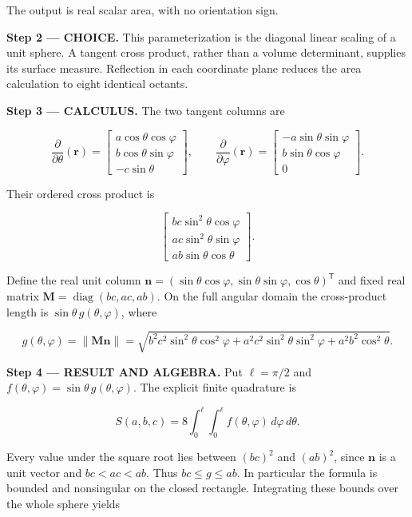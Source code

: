 \documentclass[11pt,oneside,openany]{book}
\begin{document}
The output is real scalar area, with no orientation sign.

\begin{ChoiceStep}
\textbf{Step 2 --- CHOICE.} This parameterization is the diagonal linear scaling of a unit sphere. A tangent cross product, rather than a volume determinant, supplies its surface measure. Reflection in each coordinate plane reduces the area calculation to eight identical octants.

\end{ChoiceStep}
\textbf{Step 3 --- CALCULUS.} The two tangent columns are

\[
\frac{\partial}{\partial\theta}(\mathbf r)=
\begin{bmatrix}a\cos\theta\cos\varphi\\b\cos\theta\sin\varphi\\-c\sin\theta\end{bmatrix},
\qquad
\frac{\partial}{\partial\varphi}(\mathbf r)=
\begin{bmatrix}-a\sin\theta\sin\varphi\\b\sin\theta\cos\varphi\\0\end{bmatrix}.
\]

Their ordered cross product is

\[
\begin{bmatrix}
bc\sin^2\theta\cos\varphi\\
ac\sin^2\theta\sin\varphi\\
ab\sin\theta\cos\theta
\end{bmatrix}.
\]

Define the real unit column \(\mathbf n=(\sin\theta\cos\varphi,\sin\theta\sin\varphi,\cos\theta)^{\mathsf T}\) and fixed real matrix \(\mathbf M=\operatorname{diag}(bc,ac,ab)\). On the full angular domain the cross-product length is \(\sin\theta\,g(\theta,\varphi)\), where

\[
g(\theta,\varphi)=\|\mathbf M\mathbf n\|
=\sqrt{b^2c^2\sin^2\theta\cos^2\varphi
+a^2c^2\sin^2\theta\sin^2\varphi+a^2b^2\cos^2\theta}.
\]

\textbf{Step 4 --- RESULT AND ALGEBRA.} Put \(\ell=\pi/2\) and \(f(\theta,\varphi)=\sin\theta\,g(\theta,\varphi)\). The explicit finite quadrature is

\[
S(a,b,c)=8\int_0^\ell\int_0^\ell f(\theta,\varphi)\,d\varphi\,d\theta.
\]

Every value under the square root lies between \((bc)^2\) and \((ab)^2\), since \(\mathbf n\) is a unit vector and \(bc<ac<ab\). Thus \(bc\le g\le ab\). In particular the formula is bounded and nonsingular on the closed rectangle. Integrating these bounds over the whole sphere yields
\end{document}
